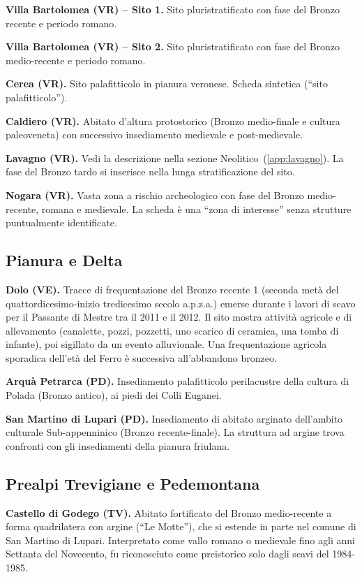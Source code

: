 \textbf{Villa Bartolomea (VR) -- Sito 1.} Sito pluristratificato con fase del Bronzo recente e periodo romano.

\textbf{Villa Bartolomea (VR) -- Sito 2.} Sito pluristratificato con fase del Bronzo medio-recente e periodo romano.

\textbf{Cerea (VR).} Sito palafitticolo in pianura veronese. Scheda sintetica (``sito palafitticolo'').

\textbf{Caldiero (VR).} Abitato d'altura protostorico (Bronzo medio-finale e cultura paleoveneta) con successivo insediamento medievale e post-medievale.

\textbf{Lavagno (VR).} \label{app:lavagno_bronzo} Vedi la descrizione nella sezione Neolitico~(\ref{app:lavagno}). La fase del Bronzo tardo si inserisce nella lunga stratificazione del sito.

\textbf{Nogara (VR).} Vasta zona a rischio archeologico con fase del Bronzo medio-recente, romana e medievale. La scheda è una ``zona di interesse'' senza strutture puntualmente identificate.

\subsection{Pianura e Delta}

\textbf{Dolo (VE).} Tracce di frequentazione del Bronzo recente 1 (seconda metà del quattordicesimo-inizio tredicesimo secolo a.p.z.a.) emerse durante i lavori di scavo per il Passante di Mestre tra il 2011 e il 2012. Il sito mostra attività agricole e di allevamento (canalette, pozzi, pozzetti, uno scarico di ceramica, una tomba di infante), poi sigillato da un evento alluvionale. Una frequentazione agricola sporadica dell'età del Ferro è successiva all'abbandono bronzeo.

\textbf{Arquà Petrarca (PD).} Insediamento palafitticolo perilacustre della cultura di Polada (Bronzo antico), ai piedi dei Colli Euganei.

\textbf{San Martino di Lupari (PD).} Insediamento di abitato arginato dell'ambito culturale Sub-appenninico (Bronzo recente-finale). La struttura ad argine trova confronti con gli insediamenti della pianura friulana.

\subsection{Prealpi Trevigiane e Pedemontana}

\textbf{Castello di Godego (TV).} Abitato fortificato del Bronzo medio-recente a forma quadrilatera con argine (``Le Motte''), che si estende in parte nel comune di San Martino di Lupari. Interpretato come vallo romano o medievale fino agli anni Settanta del Novecento, fu riconosciuto come preistorico solo dagli scavi del 1984-1985.


